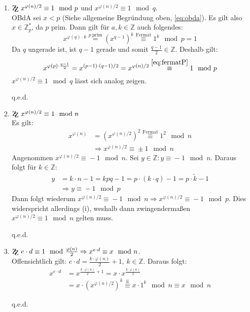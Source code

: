 \documentclass[DIN, pagenumber=false, fontsize=11pt, parskip=half]{scrartcl}
\newcommand{\Z}[0]{\mathbb{Z}}
\newcommand{\ZZ}{\mathrm{Z\kern-.3em\raise-0.5ex\hbox{Z}}}
\newcommand{\congTo}[3][]{\stackrel{#1}{\equiv} #2\mod #3}
\newcommand{\Qed}{\begin{flushright}
    q.e.d.
\end{flushright}}
\begin{document}
    \begin{enumerate}[label=(\roman*)]
        \item $\ZZ \ x^{\varphi(n)/2} \congTo{1}{p}$ und $x^{\varphi(n)/2} \congTo{1}{q}$. \\
              OBdA sei $x < p$ (Siehe allgemeine Begründung oben, \cref{eq:obda}). Es gilt also $x \in \Z_p^*$, da $p$ prim. Dann gilt für $a, k \in \Z$
              auch folgendes:
              \begin{equation}
                  x^{\varphi(q) \cdot k} \stackrel{p \ \text{prim}}{=} \left(x^{q - 1}\right)^k \congTo[\text{Fermat}]{1^k}{p} = 1
                  \label{eq:fermatP}
              \end{equation}
              Da $q$ ungerade ist, ist $q - 1$ gerade und somit $\frac{q - 1}{2} \in \Z$. Deshalb gilt:
              \begin{equation}
                  x^{\varphi(p) \cdot \frac{q - 1}{2}} = x^{(p - 1) \cdot (q - 1) / 2} = x^{\varphi(n) / 2} \congTo[\ref{eq:fermatP}]{1}{p}
              \end{equation}
              $x^{\varphi(n)/2} \congTo{1}{q}$ lässt sich analog zeigen. \Qed
        \item $\ZZ \ x^{\varphi(n)/2} \congTo{1}{n}$ \\
              Es gilt:
              \begin{align}
                  x^{\varphi(n)} &= \left(x^{\varphi(n)/2}\right)^2 \congTo[\text{Fermat}]{1^2}{n} \\
                  &\Rightarrow x^{\varphi(n)/2} \congTo{\pm 1}{n}
              \end{align}
              Angenommen $x^{\varphi(n)/2} \congTo{-1}{n}$. Sei $y \in \Z : y \congTo{-1}{n}$. Daraus folgt für $k \in \Z$:
              \begin{align}
                  y &= k \cdot n - 1 = k p q - 1 = p \cdot (k \cdot q) - 1 = p \cdot \tilde{k} -1 \\
                  &\Rightarrow y \congTo{-1}{p} \label{eq:mOneInP}
              \end{align}
              Dann folgt wiederum $x^{\varphi(n)/2} \congTo{- 1}{n} \Rightarrow x^{\varphi(n)/2} \congTo{- 1}{p}$. Dies widerspricht allerdings (i), 
              weshalb dann zwingendermaßen $x^{\varphi(n)/2} \congTo{1}{n}$ gelten muss. \Qed
        \item $\ZZ \ e \cdot d \congTo{1}{\frac{\varphi(n)}{2}} \Rightarrow x^{e \cdot d} \congTo{x}{n}$. \\
              Offensichtlich gilt: $e \cdot d = \frac{k \cdot \varphi(n)}{2} + 1, \ k \in \Z$. Daraus folgt:
              \begin{align}
                  x^{e \cdot d} &= x^{\frac{k \cdot \varphi(n)}{2} + 1} = x \cdot x^{\frac{k \cdot \varphi(n)}{2}} \\
                   &= x \cdot \left(x^{\varphi(n)/2}\right)^k \congTo[\text{ii}]{x \cdot 1^k}{n} \congTo{x}{n}
              \end{align}
              \Qed
    \end{enumerate}
\end{document}
